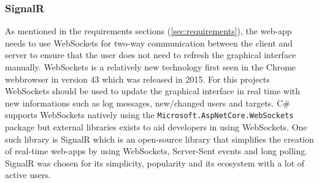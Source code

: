 \documentclass{article}
\begin{document}
\subsubsection{SignalR}
As mentioned in the requirements sections (\ref{sec:requirements}), the web-app needs to use WebSockets for two-way communication between the client and server to ensure that the user does not need to refresh the graphical interface manually. WebSockets is a relatively new technology first seen in the Chrome webbrowser in version 43 which was released in 2015\cite{url:implementation:websockets}. For this projects WebSockets should be used to update the graphical interface in real time with new informations such as log messages, new/changed users and targets. C\# supports WebSockets natively using the \texttt{Microsoft.AspNetCore.WebSockets} package but external libraries exists to aid developers in using WebSockets. One such library is SignalR\cite{url:implementation:signalr} which is an open-source library that simplifies the creation of real-time web-apps by using WebSockets, Server-Sent events and long polling. SignalR was chosen for its simplicity, popularity and its ecosystem with a lot of active users.
\end{document}
